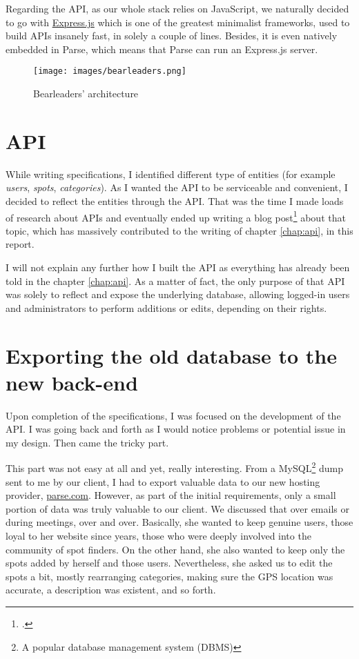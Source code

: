 Regarding the API, as our whole stack relies on JavaScript, we naturally decided to go with \href{http://expressjs.com/}{Express.js} which is one of the greatest minimalist frameworks, used to build APIs insanely fast, in solely a couple of lines. Besides, it is even natively embedded in Parse, which means that Parse can run an Express.js server.

\begin{figure}[!h]
   \centering\texttt{[image: images/bearleaders.png]}
   \caption[Bearleaders' architecture]{Bearleaders' architecture}
\end{figure}

\section{API}

While writing specifications, I identified different type of entities (for example \textit{users}, \textit{spots}, \textit{categories}). As I wanted the API to be serviceable and convenient, I decided to reflect the entities through the API. That was the time I made loads of research about APIs and eventually ended up writing a blog post\footcite[See the reference][in the bibliography]{api_my_blog} about that topic, which has massively contributed to the writing of chapter \ref{chap:api}, in this report.

\medskip

I will not explain any further how I built the API as everything has already been told in the chapter \ref{chap:api}. As a matter of fact, the only purpose of that API was solely to reflect and expose the underlying database, allowing logged-in users and administrators to perform additions or edits, depending on their rights.

\section{Exporting the old database to the new back-end}

Upon completion of the specifications, I was focused on the development of the API. I was going back and forth as I would notice problems or potential issue in my design. Then came the tricky part.

\medskip

This part was not easy at all and yet, really interesting. From a MySQL\footnote{A popular database management system (DBMS)} dump sent to me by our client, I had to export valuable data to our new hosting provider, \href{https://www.parse.com}{parse.com}. However, as part of the initial requirements, only a small portion of data was truly valuable to our client. We discussed that over emails or during meetings, over and over. Basically, she wanted to keep genuine users, those loyal to her website since years, those who were deeply involved into the community of spot finders. On the other hand, she also wanted to keep only the spots added by herself and those users. Nevertheless, she asked us to edit the spots a bit, mostly rearranging categories, making sure the GPS location was accurate, a description was existent, and so forth.

